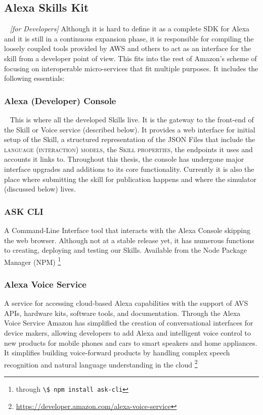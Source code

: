 	
	\subsection*{Alexa Skills Kit}~\label{ask:def} \textit{[for Developers]} Although it is hard to define it as a complete SDK for Alexa and it is still in a continuous expansion phase, it is responsible for compiling the loosely coupled tools provided by AWS and others to act as an interface for the skill from a developer point of view. This fits into the rest of Amazon's scheme of focusing on interoperable micro-services that fit multiple purposes. It includes the following essentials:
	
	
		\subsubsection*{Alexa (Developer) Console}~\label{ask:devconsole} This is where all the developed Skills live. It is the gateway to the front-end of the Skill or Voice service (described below). It provides a web interface for initial setup of the Skill, a structured representation of the JSON Files that include the \textsc{language (interaction) models}, the \textsc{Skill properties}, the endpoints it uses and accounts it links to. 
		Throughout this thesis, the console has undergone major interface upgrades and additions to its core functionality. Currently it is also the place where submitting the skill for publication happens and where the simulator (discussed below) lives.
		
		\subsubsection*{ASK CLI} %
		A Command-Line Interface tool that interacts with the Alexa Console skipping the web browser. %
		Although not at a stable release yet, it has numerous functions to creating, deploying and testing our Skills. %
		Available from the Node Package Manager (NPM) \footnote{
			through \lstinline|\$ npm install ask-cli| }
		
		
		\subsubsection*{Alexa Voice Service} %
		 A service for accessing cloud-based Alexa capabilities with the support of AVS APIs, hardware kits, software tools, and documentation. Through the Alexa Voice Service Amazon has simplified the creation of conversational interfaces for device makers, allowing developers to add Alexa and intelligent voice control to new products for mobile phones and cars to smart speakers and home appliances.
		 It simplifies building voice-forward products by handling complex speech recognition and natural language understanding in the cloud \footnote{\url{https://developer.amazon.com/alexa-voice-service}}\\



